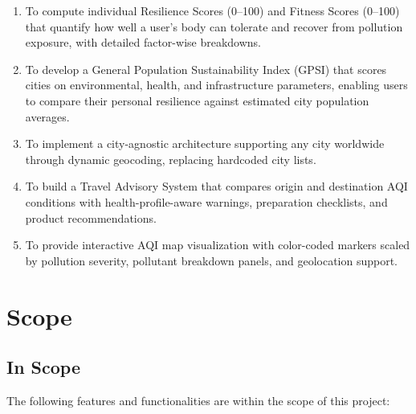 \documentclass[12pt,a4paper]{report}
\begin{document}
\begin{enumerate}[leftmargin=*]
  \item To compute individual Resilience Scores (0--100) and Fitness Scores (0--100) that quantify how well a user's body can tolerate and recover from pollution exposure, with detailed factor-wise breakdowns.

  \item To develop a General Population Sustainability Index (GPSI) that scores cities on environmental, health, and infrastructure parameters, enabling users to compare their personal resilience against estimated city population averages.

  \item To implement a city-agnostic architecture supporting any city worldwide through dynamic geocoding, replacing hardcoded city lists.

  \item To build a Travel Advisory System that compares origin and destination AQI conditions with health-profile-aware warnings, preparation checklists, and product recommendations.

  \item To provide interactive AQI map visualization with color-coded markers scaled by pollution severity, pollutant breakdown panels, and geolocation support.
\end{enumerate}


\chapter{Scope}

\section{In Scope}

The following features and functionalities are within the scope of this project:
\end{document}
